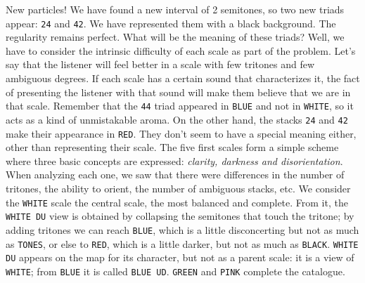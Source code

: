 \documentclass[]{report}
\begin{document}
\begin{table}[H]
  \centering
  \caption{Particles  of 7 notes}\label{tab:particles-seven-notes-red}
\end{table}

New particles! We have found a new interval of 2 semitones, so two new triads appear: \texttt{24} and \texttt{42}. We have represented them with a black background. The regularity remains perfect. What will be the meaning of these triads?
Well, we have to consider the intrinsic difficulty of each scale as part of the problem. Let's say that the listener will feel better in a scale with few tritones and few ambiguous degrees. If each scale has a certain sound that characterizes it, the fact of presenting the listener with that sound will make them believe that we are in that scale. Remember that the \texttt{44} triad appeared in \texttt{BLUE} and not in \texttt{WHITE}, so it acts as a kind of unmistakable aroma.
On the other hand, the stacks \texttt{24} and \texttt{42} make their appearance in \texttt{RED}. They don't seem to have a special meaning either, other than representing their scale.
The five first scales form a simple scheme where three basic concepts are expressed: \emph{clarity, darkness and disorientation}. When analyzing each one, we saw that there were differences in the number of tritones, the ability to orient, the number of ambiguous stacks, etc. We consider the \texttt{WHITE} scale the central scale, the most balanced and complete. From it, the \texttt{WHITE DU} view is obtained by collapsing the semitones that touch the tritone; by adding tritones we can reach \texttt{BLUE}, which is a little disconcerting but not as much as \texttt{TONES}, or else to \texttt{RED}, which is a little darker, but not as much as \texttt{BLACK}. \texttt{WHITE DU} appears on the map for its character, but not as a parent scale: it is a view of \texttt{WHITE}; from \texttt{BLUE} it is called \texttt{BLUE UD}. \texttt{GREEN} and \texttt{PINK} complete the catalogue.
\end{document}

